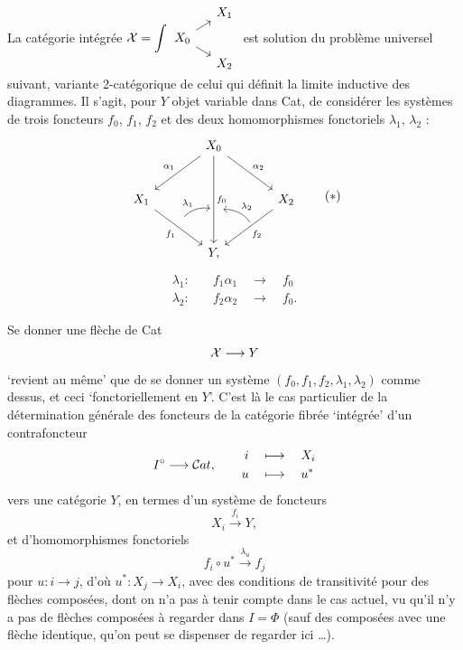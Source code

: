 La catégorie intégrée $\cX = \displaystyle\int
\begin{tikzcd}[column sep=small, row sep=tiny, ampersand replacement=\&, baseline=(\tikzcdmatrixname-2-1.base)]
 \& X_1 \\
X_0 \arrow[ur] \arrow[dr] \& \\
 \& X_2
\end{tikzcd}$ est solution du problème universel suivant, variante 2-catégorique de celui qui définit la limite inductive des diagrammes. Il s'agit, pour $Y$ objet variable dans Cat, de considérer les systèmes de trois foncteurs $f_0$, $f_1$, $f_2$ et des deux homomorphismes fonctoriels $\lambda_1$, $\lambda_2$ :
\[
\begin{tikzcd}[column sep=large, row sep=large, ampersand replacement=\&]
 \& X_0 \arrow[dl, "\alpha_1"'] \arrow[dr, "\alpha_2"] \arrow[dd, "f_0", ""{name=M, pos=0.62}] \& \\
X_1 \arrow[dr, "f_1"', ""{name=A, pos=0.45}] \& \& X_2 \arrow[dl, "f_2", ""{name=B, pos=0.45}] \\
 \& Y, \&
\arrow[from=A, to=M, bend left, shorten=3pt, "\lambda_1"]
\arrow[from=B, to=M, bend right, shorten=3pt, "\lambda_2"']
\end{tikzcd}
\tag*{$(*)$}
\]
\[
\begin{aligned}
\lambda_1 :\quad & f_1\alpha_1 \quad\longrightarrow\quad f_0\\
\lambda_2 :\quad & f_2\alpha_2 \quad\longrightarrow\quad f_0.
\end{aligned}
\]

Se donner une flèche de Cat
\[
\mathcal{X} \longrightarrow Y
\]
`revient au même' que de se donner un système $(f_0, f_1, f_2, \lambda_1, \lambda_2)$ comme dessus, et ceci `fonctoriellement en $Y$'. C'est là le cas particulier de la détermination générale des foncteurs de la catégorie fibrée `intégrée' d'un contrafoncteur
\[
I^{\circ} \longrightarrow \mathcal{C}at, \qquad
\begin{aligned}
i &\quad\longmapsto\quad X_i\\
u &\quad\longmapsto\quad u^*
\end{aligned}
\]
vers une catégorie $Y$, en termes d'un système de foncteurs
\[
X_i \xrightarrow{f_i} Y,
\]
et d'homomorphismes fonctoriels
\[
f_i\circ u^* \xrightarrow{\lambda_u} f_j
\]
pour $u : i \longrightarrow j$, d'où $u^* : X_j \longrightarrow X_i$, avec des conditions de transitivité pour des flèches composées, dont on n'a pas à tenir compte dans le cas actuel, vu qu'il n'y a pas de flèches composées à regarder dans $I = \Phi$ (sauf des composées avec une flèche identique, qu'on peut se dispenser de regarder ici \dots).

